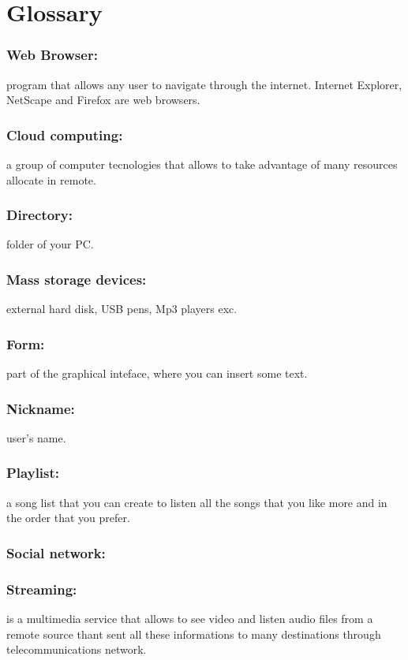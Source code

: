 \chapter{Glossary}
\thispagestyle{fancy}

\subsection*{Web Browser:} program that allows any user to navigate through the
internet. Internet Explorer, NetScape and Firefox are web browsers. 
\subsection*{Cloud computing:} a group of computer tecnologies that allows to
take advantage of many resources allocate in remote. 
\subsection*{Directory:}
folder of your PC. 
\subsection*{Mass storage devices:} external hard disk, USB pens, Mp3 players
exc. 
\subsection*{Form:} part of the graphical inteface, where you can insert some
text. 
\subsection*{Nickname:} user's name.
\subsection*{Playlist:} a song list that you can create to listen all the songs
that you like more and in the order that you prefer. 
\subsection*{Social network:} 
\subsection*{Streaming:} is a multimedia service that allows to see video and
listen audio files from a remote source thant sent all these informations to
many destinations through telecommunications network.

